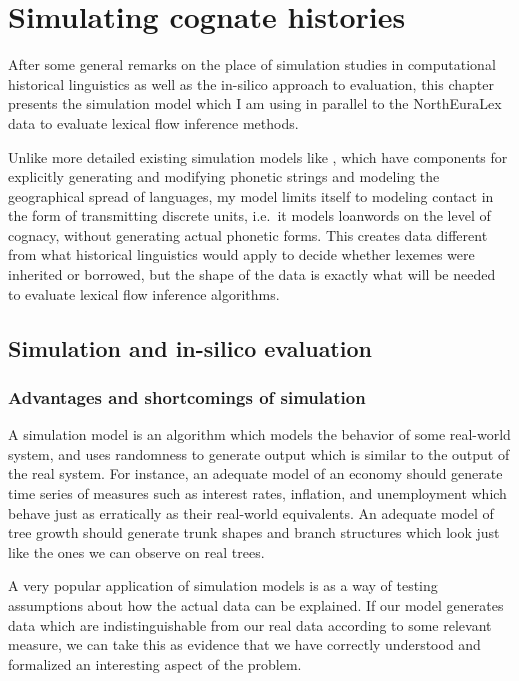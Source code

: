 \chapter{Simulating cognate histories}
After some general remarks on the place of simulation studies in computational historical linguistics as well as the in-silico approach to evaluation, this chapter presents the simulation model which I am using in parallel to the NorthEuraLex data to evaluate lexical flow inference methods.

Unlike more detailed existing simulation models like \cite{hochmuth_ea_2008}, which have components for explicitly generating and modifying phonetic strings and modeling the geographical spread of languages, my model limits itself to modeling contact in the form of transmitting discrete units, i.e.\ it models loanwords on the level of cognacy, without generating actual phonetic forms. This creates data different from what historical linguistics would apply to decide whether lexemes were inherited or borrowed, but the shape of the data is exactly what will be needed to evaluate lexical flow inference algorithms. 

\section{Simulation and in-silico evaluation}

\subsection{Advantages and shortcomings of simulation}
A simulation model is an algorithm which models the behavior of some real-world system, and uses randomness to generate output which is similar to the output of the real system. For instance, an adequate model of an economy should generate time series of measures such as interest rates, inflation, and unemployment which behave just as erratically as their real-world equivalents. An adequate model of tree growth should generate trunk shapes and branch structures which look just like the ones we can observe on real trees.

A very popular application of simulation models is as a way of testing assumptions about how the actual data can be explained. If our model generates data which are indistinguishable from our real data according to some relevant measure, we can take this as evidence that we have correctly understood and formalized an interesting aspect of the problem.

